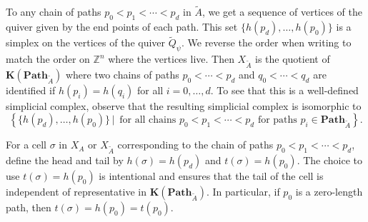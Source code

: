 \documentclass{amsart}
\newcommand{\ZZ}{\mathbb{Z}}
\newcommand{\Path}{\mathbf{Path}}
\newcommand{\Order}{\mathbf{K}}
\theoremstyle{remark}
\begin{document}
To any chain of paths $p_0<p_1<\cdots<p_d$ in $\widetilde{A}$, we get a sequence of vertices of the quiver given by the end points of each path.
This set $\{h(p_d),\ldots,h(p_0)\}$ is a simplex on the vertices of the quiver $\widetilde{Q}_\psi$.
We reverse the order when writing to match the order on $\ZZ^n$ where the vertices live.
Then $X_{\widetilde{A}}$ is the quotient of $\Order(\Path_{\widetilde{A}})$ where two chains of paths $p_0<\cdots<p_d$ and $q_0<\cdots < q_d$ are identified if $h(p_i) = h(q_i)$ for all $i=0,\ldots,d$. To see that this is a well-defined simplicial complex, observe that the resulting simplicial complex is isomorphic to
\[\left\{\{h(p_d),\ldots,h(p_0)\} \,|\, \text{ for all chains } p_0<p_1<\cdots<p_d\text{ for paths } p_i\in \Path_{\widetilde{A}}\right\}.\]

For a cell $\sigma$ in $X_{A}$ or $X_{\widetilde{A}}$ corresponding to the chain of paths $p_0<p_1<\cdots<p_d$, define the head and tail by $h(\sigma)=h(p_d)$ and $t(\sigma)=h(p_0)$. The choice to use $t(\sigma)=h(p_0)$ is intentional and ensures that the tail of the cell is independent of representative in $\Order(\Path_{\widetilde{A}})$. In particular, if $p_0$ is a zero-length path, then $t(\sigma)=h(p_0)=t(p_0)$.
\end{document}
